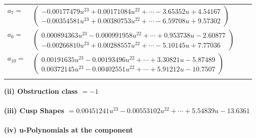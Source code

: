 \documentclass[1p]{elsarticle_modified}
\theoremstyle{definition}
\begin{document}
\begin{tabular}{m{7pt} m{180pt} m{7pt} m{180pt} }
\flushright $a_{7}=$&$\begin{pmatrix}-0.00177479 u^{23}+0.00171084 u^{22}+\cdots-3.65352 u+4.54167\\-0.00354581 u^{23}+0.00380753 u^{22}+\cdots-6.59708 u+9.57302\end{pmatrix}$ \\
\flushright $a_{6}=$&$\begin{pmatrix}0.000894363 u^{23}-0.000991958 u^{22}+\cdots+0.953738 u-2.60877\\-0.00266810 u^{23}+0.00288557 u^{22}+\cdots-5.10145 u+7.77036\end{pmatrix}$ \\
\flushright $a_{10}=$&$\begin{pmatrix}0.00191635 u^{23}-0.00193496 u^{22}+\cdots+3.30821 u-5.87489\\0.00372145 u^{23}-0.00402551 u^{22}+\cdots+5.91212 u-10.7507\end{pmatrix}$\\&\end{tabular}
\flushleft \textbf{(ii) Obstruction class $= -1$}\\~\\
\flushleft \textbf{(iii) Cusp Shapes $= 0.00451241 u^{23}-0.00553102 u^{22}+\cdots+5.54839 u-13.6361$}\\~\\
\newpage\renewcommand{\arraystretch}{1}
\flushleft \textbf{(iv) u-Polynomials at the component}\newline \\
\end{document}
